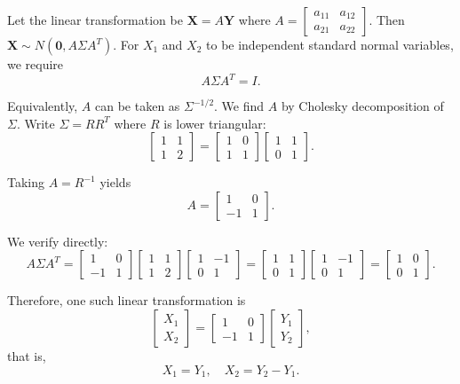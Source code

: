 \documentclass[a4paper, UTF-8]{article}
\theoremstyle{plain}
\begin{document}
Let the linear transformation be $\mathbf{X} = A\mathbf{Y}$ where $A = \begin{bmatrix} a_{11} & a_{12} \\ a_{21} & a_{22} \end{bmatrix}$. Then $\mathbf{X} \sim N(\mathbf{0}, A\Sigma A^T)$. For $X_1$ and $X_2$ to be independent standard normal variables, we require
$$
A\Sigma A^T = I.
$$

Equivalently, $A$ can be taken as $\Sigma^{-1/2}$. We find $A$ by Cholesky decomposition of $\Sigma$. Write $\Sigma = RR^T$ where $R$ is lower triangular:
$$
\begin{bmatrix} 1 & 1 \\ 1 & 2 \end{bmatrix} = \begin{bmatrix} 1 & 0 \\ 1 & 1 \end{bmatrix} \begin{bmatrix} 1 & 1 \\ 0 & 1 \end{bmatrix}.
$$

Taking $A = R^{-1}$ yields
$$
A = \begin{bmatrix} 1 & 0 \\ -1 & 1 \end{bmatrix}.
$$

We verify directly:
$$
A\Sigma A^T = \begin{bmatrix} 1 & 0 \\ -1 & 1 \end{bmatrix} \begin{bmatrix} 1 & 1 \\ 1 & 2 \end{bmatrix} \begin{bmatrix} 1 & -1 \\ 0 & 1 \end{bmatrix} = \begin{bmatrix} 1 & 1 \\ 0 & 1 \end{bmatrix} \begin{bmatrix} 1 & -1 \\ 0 & 1 \end{bmatrix} = \begin{bmatrix} 1 & 0 \\ 0 & 1 \end{bmatrix}.
$$

Therefore, one such linear transformation is
$$
\boxed{\begin{bmatrix} X_1 \\ X_2 \end{bmatrix} = \begin{bmatrix} 1 & 0 \\ -1 & 1 \end{bmatrix} \begin{bmatrix} Y_1 \\ Y_2 \end{bmatrix}},
$$
that is,
$$
X_1 = Y_1, \quad X_2 = Y_2 - Y_1.
$$
\end{document}
